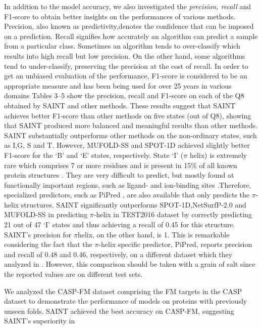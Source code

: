 \documentclass[11 pt, a4paper]{article}
\begin{document}
\begin{multicols}{2}
In addition to the model accuracy, we also investigated the 
\textit{precision, recall} and F1-score to obtain better
insights on the performances of various methods. Precision,
also known as predictivity,denotes the confidence that can be
imposed on a prediction. Recall signifies how accurately an
algorithm can predict a sample from a particular class. 
Sometimes an algorithm tends to over-classify
which results into high recall but low precision. On the 
other hand, some algorithms tend to under-classify, 
preserving the precision at the cost of recall. In order to
get an unbiased evaluation of the performance, F1-score is
considered to be an appropriate measure and has been being
used for over 25 years in various domains \cite{Sasaki}
Tables 3–5 show the precision, recall and F1-score on each of
the Q8 obtained by SAINT and other methods. These results
suggest that SAINT achieves better F1-score than other
methods on five states (out of Q8), showing that SAINT
produced more balanced and meaningful
results than other methods. SAINT substantially outperforms
other methods on the non-ordinary states\cite{Wang}, such as
I,G, S and T. However, MUFOLD-SS and SPOT-1D achieved slightly
better F1-score for the ‘B’ and ‘E’ states, respectively.
State ‘I’ ($\pi$ helix) is extremely rare which comprises 7 or
more residues and is present in 15\% of all known protein
structures \cite{Ludwiczak}. They are very difficult to 
predict, but mostly found at functionally important regions,
such as ligand- and ion-binding sites
\cite{Ludwiczak}.Therefore, specialized predictors, such as
PiPred \cite{Ludwiczak}, are also available that only predicts
the $\pi$-helix structures. SAINT significantly outperforms
SPOT-1D,NetSurfP-2.0 and MUFOLD-SS in predicting $\pi$-helix 
in TEST2016 dataset by correctly predicting 21 out of 47 ‘I’
states and thus achieving a recall of 0.45 for this
structure. SAINT’s precision for $\pi$helix, on the other
hand, is 1. This is remarkable considering the
fact that the $\pi$-helix specific predictor, PiPred, reports
precision and recall of 0.48 and 0.46, respectively, on a
different dataset which they analyzed in \cite{Ludwiczak}. However, this comparison should be taken with a grain of salt
since the reported values are on different test sets.\par
We analyzed the CASP-FM dataset comprising the FM targets in
the CASP dataset to demonstrate the performance of models on
proteins with previously unseen folds. SAINT achieved the
best accuracy on CASP-FM, suggesting SAINT’s superiority in

\end{multicols}
\end{document}
